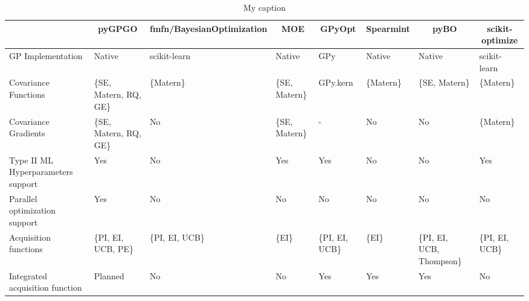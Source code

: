 \documentclass[10pt,a4paper,twoside]{book}
\begin{document}
\begin{table}[]
	\centering
	\caption{My caption}
	\label{my-label}
	\begin{tabular}{@{}llllllll@{}}
		\toprule
		& \multicolumn{1}{c}{\textbf{pyGPGO}} & \multicolumn{1}{c}{fmfn/BayesianOptimization} & \multicolumn{1}{c}{MOE} & \multicolumn{1}{c}{GPyOpt} & \multicolumn{1}{c}{Spearmint} & \multicolumn{1}{c}{pyBO}  & \multicolumn{1}{c}{scikit-optimize} \\ \midrule
		GP Implementation                  & Native                              & scikit-learn                                  & Native                  & GPy                        & Native                        & Native                    & scikit-learn                        \\
		Covariance Functions               & \{SE, Matern, RQ, GE\}              & \{Matern\}                                    & \{SE, Matern\}          & GPy.kern                   & \{Matern\}                    & \{SE, Matern\}            & \{Matern\}                          \\
		Covariance Gradients               & \{SE, Matern, RQ, GE\}              & No                                            & \{SE, Matern\}          & -                          & No                            & No                        & \{Matern\}                          \\
		Type II ML Hyperparameters support & Yes                                 & No                                            & Yes                     & Yes                        & No                            & No                        & Yes                                 \\
		Parallel optimization support      & Yes                                 & No                                            & No                      & No                         & No                            & No                        & No                                  \\
		Acquisition functions              & \{PI, EI, UCB, PE\}                 & \{PI, EI, UCB\}                               & \{EI\}                  & \{PI, EI, UCB\}            & \{EI\}                        & \{PI, EI, UCB, Thompson\} & \{PI, EI, UCB\}                     \\
		Integrated acquisition function    & Planned                             & No                                            & No                      & Yes                        & Yes                           & Yes                       & No                                  \\

\end{tabular}
\end{table}
\end{document}
